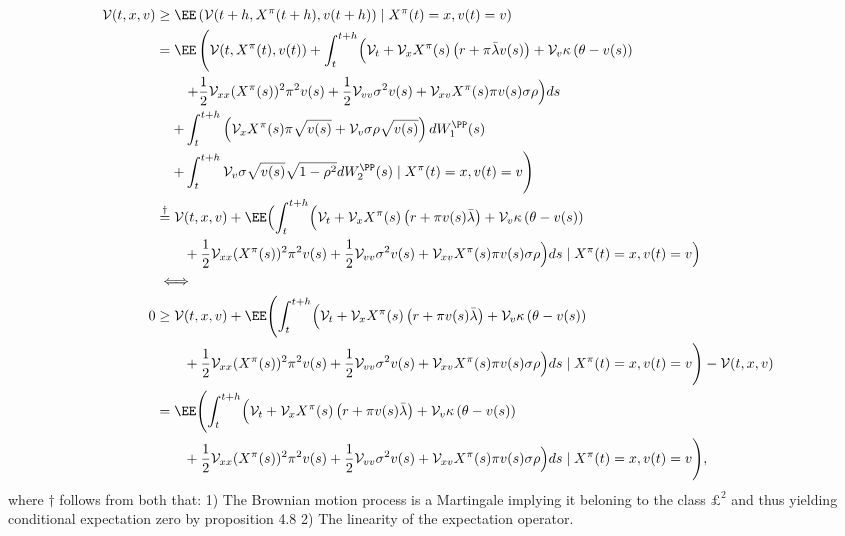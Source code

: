 \documentclass[11pt]{article}
\numberwithin{equation}{section}
\begin{document}
\begin{align*}
\mathcal{V}(t, x, v) &\geq \EE \left( \mathcal{V}(t+h, X^\pi(t+h), v(t+h)) \mid X^\pi(t)=x,v(t)=v \right )\\
&= \EE \left( \mathcal{V}(t, X^\pi(t), v(t)) + \int_{t}^{t+h} \Bigl( \mathcal{V}_t + \mathcal{V}_x X^\pi(s) \left( r + \pi\bar{\lambda} v(s) \right) + \mathcal{V}_v \kappa \left( \theta - v(s) \right) \right.  \\
&\quad\quad \left. + \frac{1}{2} \mathcal{V}_{xx} (X^\pi(s))^2 \pi^2 v(s) + \frac{1}{2} \mathcal{V}_{vv} \sigma^2 v(s) + \mathcal{V}_{xv} X^\pi(s) \pi v(s) \sigma \rho \Bigr) ds \right. \\
&\quad \left. + \int_{t}^{t+h} \left( \mathcal{V}_x X^\pi(s) \pi \sqrt{v(s)} + \mathcal{V}_v \sigma \rho \sqrt{v(s)} \right) dW^\PP_1(s) \right. \\
&\quad \left. + \int_{t}^{t+h} \mathcal{V}_v \sigma \sqrt{v(s)} \sqrt{1 - \rho^2} dW^\PP_2(s) \mid X^\pi(t) = x, v(t) = v \right) \\
&\overset{\dagger}{=} \mathcal{V}(t, x, v) + \EE \Bigl( \int_{t}^{t+h} \Bigl( \mathcal{V}_t + \mathcal{V}_{x} X^\pi(s)  \left( r + \pi v(s)\bar{\lambda} \right) + \mathcal{V}_v \kappa \left( \theta - v(s) \right)  \\
&\quad \quad + \frac{1}{2} \mathcal{V}_{xx}(X^\pi(s) )^2 \pi^2 v(s) + \frac{1}{2} \mathcal{V}_{vv} \sigma^2 v(s)+ \mathcal{V}_{xv} X^\pi(s) \pi v(s) \sigma \rho \Bigr) ds \mid X^\pi(t)=x,v(t)=v \Bigr)\\
&\iff\\
 0 &\geq \mathcal{V}(t, x, v) + \EE \Biggl( \int_t^{t+h}\Bigl( \mathcal{V}_t + \mathcal{V}_{x}  X^\pi(s)\left( r + \pi v(s) \bar{\lambda} \right) + \mathcal{V}_v \kappa \left( \theta - v(s) \right) \\
&\quad  \quad + \frac{1}{2} \mathcal{V}_{xx}( X^\pi(s))^2 \pi^2 v(s) + \frac{1}{2} \mathcal{V}_{vv} \sigma^2 v(s) + \mathcal{V}_{xv} X^\pi(s) \pi v(s) \sigma \rho \Bigr)ds \mid  X^\pi(t)=x,v(t)=v \Biggr) - \mathcal{V}(t, x, v) \\
&=\EE \Biggl( \int_t^{t+h}\Bigl( \mathcal{V}_t + \mathcal{V}_{x}  X^\pi(s)\left( r + \pi v(s) \bar{\lambda} \right) + \mathcal{V}_v \kappa \left( \theta - v(s) \right) \\
&\quad \quad + \frac{1}{2} \mathcal{V}_{xx}( X^\pi(s))^2 \pi^2 v(s) + \frac{1}{2} \mathcal{V}_{vv} \sigma^2 v(s) + \mathcal{V}_{xv} X^\pi(s) \pi v(s) \sigma \rho \Bigr)ds \mid  X^\pi(t)=x,v(t)=v \Biggr),
\end{align*}
where $\dagger$ follows from both that: 1) The Brownian motion process is a
Martingale implying it beloning to the class $\pounds^2$
and thus yielding conditional expectation zero by proposition 4.8
\cite{bjork2020} 2) The linearity of the expectation operator.
\end{document}
